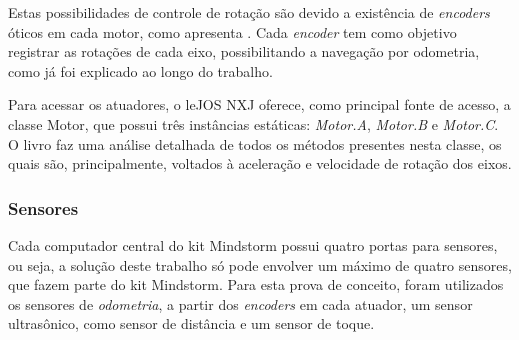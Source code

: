		Estas possibilidades de controle de rotação são devido a existência de \textit{encoders} óticos em cada motor, como apresenta \cite{legonxj}. Cada \textit{encoder} tem como objetivo registrar as rotações de cada eixo, possibilitando a navegação por odometria, como já foi explicado ao longo do trabalho.

		Para acessar os atuadores, o leJOS NXJ oferece, como principal fonte de acesso, a classe Motor, que possui três instâncias estáticas: \textit{Motor.A}, \textit{Motor.B} e \textit{Motor.C}. O livro \cite{legonxj} faz uma análise detalhada de todos os métodos presentes nesta classe, os quais são, principalmente, voltados à aceleração e velocidade de rotação dos eixos.

	\subsubsection{Sensores}

		Cada computador central do kit Mindstorm possui quatro portas para sensores, ou seja, a solução deste trabalho só pode envolver um máximo de quatro sensores, que fazem parte do kit Mindstorm. Para esta prova de conceito, foram utilizados os sensores de \textit{odometria}, a partir dos \textit{encoders} em cada atuador, um sensor ultrasônico, como sensor de distância e um sensor de toque.

